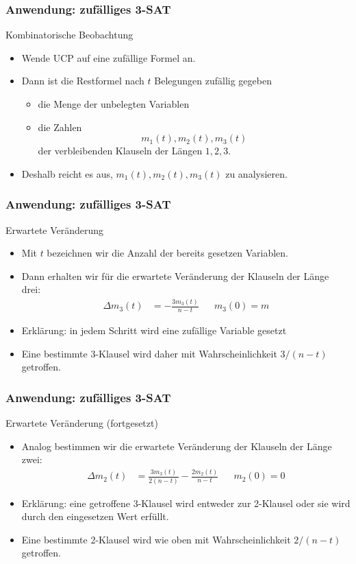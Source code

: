 \documentclass{beamer}
\newcommand{\mytitle}{Anwendung: zuf\"alliges 3-SAT}
\begin{document}
\begin{frame}\frametitle{\mytitle}
	\begin{block}{Kombinatorische Beobachtung}
		\begin{itemize}
			\item Wende UCP auf eine zuf\"allige Formel an.
			\item Dann ist die \alert{Restformel} nach $t$ Belegungen zuf\"allig gegeben
				\begin{itemize}
				\item die Menge der unbelegten Variablen
				\item die Zahlen $$m_1(t),m_2(t),m_3(t)$$ 
					der verbleibenden Klauseln der L\"angen $1,2,3$.
				\end{itemize}
			\item Deshalb reicht es aus, $m_1(t),m_2(t),m_3(t)$ zu analysieren.
		\end{itemize}
	\end{block}
\end{frame}

\begin{frame}\frametitle{\mytitle}
	\begin{block}{Erwartete Ver\"anderung}
		\begin{itemize}
			\item Mit $t$ bezeichnen wir die Anzahl der bereits gesetzen Variablen.
			\item Dann erhalten wir f\"ur die erwartete Ver\"anderung der Klauseln der L\"ange drei:
				\begin{align*}
					\Delta m_3(t)&=-\frac{3m_3(t)}{n-t}&&m_3(0)=m
				\end{align*}
			\item \alert{Erkl\"arung:} in jedem Schritt wird eine zuf\"allige Variable gesetzt
			\item Eine bestimmte 3-Klausel wird daher mit Wahrscheinlichkeit $3/(n-t)$ getroffen.
		\end{itemize}
	\end{block}
\end{frame}

\begin{frame}\frametitle{\mytitle}
	\begin{block}{Erwartete Ver\"anderung (fortgesetzt)}
		\begin{itemize}
			\item Analog bestimmen wir die erwartete Ver\"anderung der Klauseln der L\"ange zwei:
				\begin{align*}
					\Delta m_2(t)&=\frac{3m_3(t)}{2(n-t)}-\frac{2m_2(t)}{n-t}&&m_2(0)=0
				\end{align*}
			\item \alert{Erkl\"arung:} eine getroffene 3-Klausel wird entweder zur 2-Klausel oder sie wird durch den eingesetzen Wert erf\"ullt.
			\item Eine bestimmte 2-Klausel wird wie oben mit Wahrscheinlichkeit $2/(n-t)$ getroffen.
		\end{itemize}
	\end{block}
\end{frame}
\end{document}
